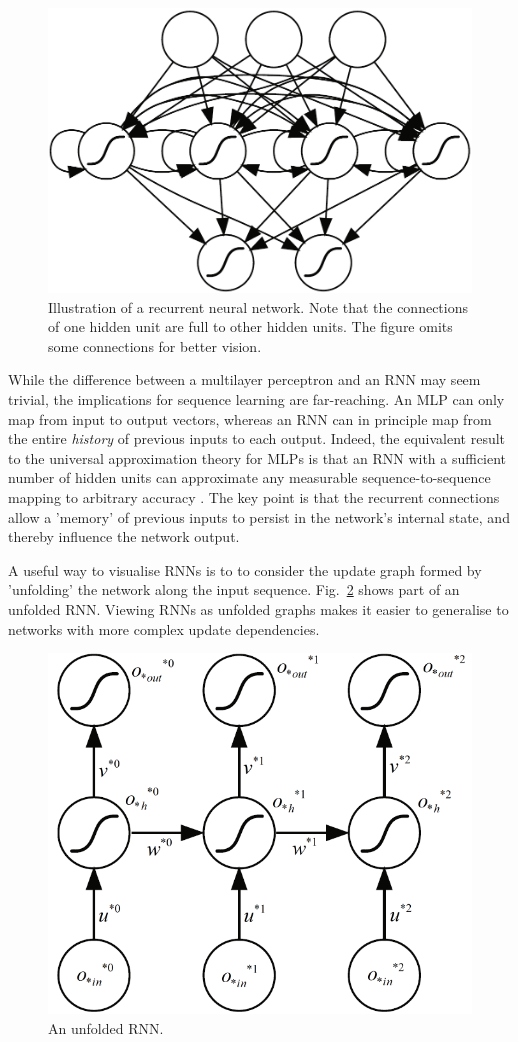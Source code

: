 \documentclass[runningheads,openany]{xhlPaper}
\begin{document}
\begin{figure}
\centering
\includegraphics[width=0.7\linewidth]{rnn}
\caption{Illustration of a recurrent neural network. Note that the connections of one hidden unit are full to other hidden units. The figure omits some connections for better vision.}
\label{fig:rnn_example}
\end{figure}

While the difference between a multilayer perceptron and an RNN may seem trivial, the implications for sequence learning are far-reaching.
An MLP can only map from input to output vectors, whereas an RNN can in principle map from the entire \emph{history} of previous inputs to each output.
Indeed, the equivalent result to the universal approximation theory for MLPs is that an RNN with a sufficient number of hidden units can approximate any measurable sequence-to-sequence mapping to arbitrary accuracy \cite{Hammer_RNN_Capability_2000}.
The key point is that the recurrent connections allow a 'memory' of previous inputs to persist in the network's internal state, and thereby influence the network output.

A useful way to visualise RNNs is to to consider the update graph formed by 'unfolding' the network along the input sequence. Fig.~\ref{fig:unfolded_rnn_example} shows part of an unfolded RNN.
Viewing RNNs as unfolded graphs makes it easier to generalise to networks with more complex update dependencies.

\begin{figure}
\centering
\includegraphics[width=0.6\linewidth]{unfolded_rnn}
\caption{An unfolded RNN.}
\label{fig:unfolded_rnn_example}
\end{figure}
\end{document}
